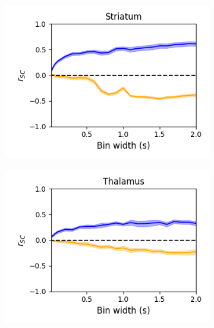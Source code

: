\documentclass[a4paper,12pt]{article}
\theoremstyle{definition}
\begin{document}
\begin{figure}[p]
\begin{subfigure}{0.5\textwidth}
    \includegraphics[width=\textwidth]{figures/linear_bin_width_relative_correlations_striatum_14.png}
  \end{subfigure}
  \begin{subfigure}{0.5\textwidth}
    \centering
    \includegraphics[width=\textwidth]{figures/linear_bin_width_relative_correlations_thalamus_15.png}
  \end{subfigure}
  \begin{subfigure}{0.5\textwidth}
    \centering

\end{subfigure}
\end{figure}
\end{document}

